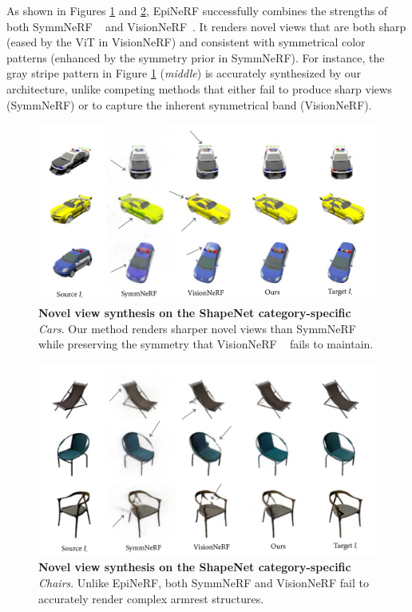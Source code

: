 As shown in Figures \ref{fig:exp-srn-cars} and \ref{fig:exp-srn-chairs}, EpiNeRF successfully combines the strengths of both SymmNeRF ~\citep{li2022symmnerf} and VisionNeRF~\citep{lin2023vision}. It renders novel views that are both sharp (eased by the ViT in VisionNeRF) and consistent with symmetrical color patterns (enhanced by the symmetry prior in SymmNeRF). For instance, the gray stripe pattern in Figure \ref{fig:exp-srn-cars} (\textit{middle}) is  accurately synthesized by our architecture, unlike competing methods that either fail to produce sharp views (SymmNeRF) or to capture the inherent symmetrical band (VisionNeRF). 

\begin{figure}[h!]
    \begin{center}
  \includegraphics[width=\linewidth]{images/epinerf/cars_BMVC.png}
  \end{center}
  \caption{\textbf{Novel view synthesis on the ShapeNet category-specific} \textit{Cars}. Our method renders sharper novel views than SymmNeRF ~\cite{li2022symmnerf} while preserving the symmetry that VisionNeRF ~\cite{lin2023vision} fails to maintain.}
  \label{fig:exp-srn-cars}
\end{figure}

\begin{figure}[h!]
    \begin{center}
  \includegraphics[width=\linewidth]{images/epinerf/chairs_BMVC.png}
  \end{center}
  \caption{\textbf{Novel view synthesis on the ShapeNet category-specific} \textit{Chairs}. Unlike EpiNeRF, both SymmNeRF \cite{li2022symmnerf} and VisionNeRF \cite{lin2023vision} fail to accurately render complex armrest structures.}
  \label{fig:exp-srn-chairs}
\end{figure}

